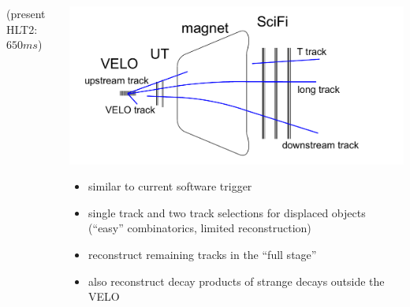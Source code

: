 \documentclass[table,xcolor=dvipsnames,professionalfonts]{beamer}
\begin{document}
\begin{frame}
\begin{columns}
\begin{column}{.5\textwidth}
{      (present HLT2: $\unit{650}{ms}$)
    }
    
  \end{column}
  \begin{column}{.5\textwidth}
    \includegraphics[width=.8\textwidth]{./ttypes.pdf}
    \begin{itemize}
        \item similar to current software trigger
          \item single track and two track selections for displaced objects
            \newline (``easy'' combinatorics, limited reconstruction)
            \item<2-> reconstruct remaining tracks in the ``full stage''
              \item<2-> also reconstruct decay products of strange decays outside the VELO
    \end{itemize}
  \end{column}
  \end{columns}
\end{frame}
\end{document}
